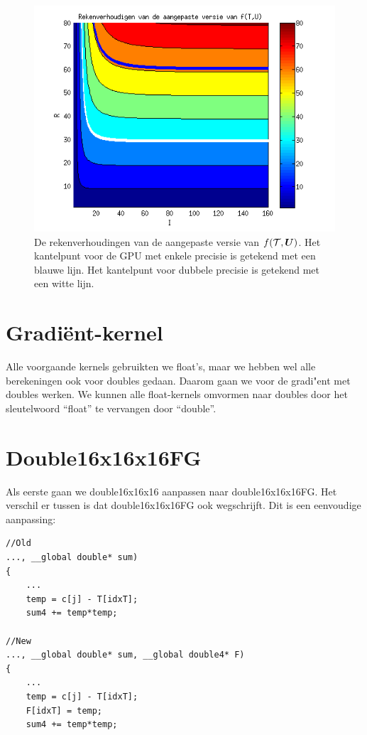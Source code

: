 \begin{figure}
\centering
\includegraphics{haalFG}
\caption{\label{haalFG}De rekenverhoudingen van de aangepaste versie van $f(\mathcal{T}, \boldsymbol{U})$. Het kantelpunt voor de GPU met enkele precisie is getekend met een blauwe lijn. Het kantelpunt voor dubbele precisie is getekend met een witte lijn.}
\end{figure}

\section{Gradi\"ent-kernel}
Alle voorgaande kernels gebruikten we float's, maar we hebben wel alle berekeningen ook voor doubles gedaan. Daarom gaan we voor de gradi"ent met doubles werken. We kunnen alle float-kernels omvormen naar doubles door het sleutelwoord ``float'' te vervangen door ``double''.

\section{Double16x16x16FG}
Als eerste gaan we double16x16x16 aanpassen naar double16x16x16FG. Het verschil er tussen is dat double16x16x16FG ook \FF{} wegschrijft. Dit is een eenvoudige aanpassing:
\begin{lstlisting}
//Old
..., __global double* sum)
{
	...
	temp = c[j] - T[idxT];
	sum4 += temp*temp;

//New
..., __global double* sum, __global double4* F)
{
	...
	temp = c[j] - T[idxT];
	F[idxT] = temp;
	sum4 += temp*temp;
\end{lstlisting}

